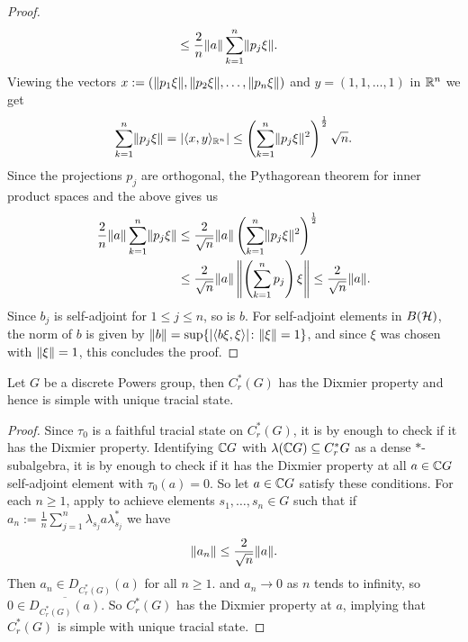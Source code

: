 \begin{proposition}
\begin{proof}
\begin{align*}
&\leq \frac{2}{n} \lVert a \rVert \sum_{k=1}^n \lVert p_j \xi \rVert.
\end{align*}
Viewing the vectors $x:=(\lVert p_1 \xi \rVert, \lVert p_2 \xi \rVert, \dots, \lVert p_n \xi \rVert)$ and $y=(1,1,\dots,1)$ in $\mathbb{R}^n$ we get
\begin{align*}
\sum_{k=1}^n \lVert p_j \xi \rVert= |\langle x , y \rangle_{\mathbb{R}^n}| \leq \left( \sum_{k=1}^n \lVert p_j \xi \rVert^2\right)^{\frac{1}{2}} \sqrt{n}.
\end{align*}
Since the projections $p_j$ are orthogonal, the Pythagorean theorem for inner product spaces and the above gives us
\begin{align*}
\frac{2}{n} \lVert a \rVert \sum_{k=1}^n \lVert p_j \xi \rVert & \leq \frac{2}{\sqrt{n}} \lVert a \rVert \left( \sum_{k=1}^n \lVert p_j \xi \rVert^2\right)^{\frac{1}{2}} \\
&\leq \frac{2}{\sqrt{n}} \lVert a \rVert \left\lVert \left(\sum_{k=1}^n p_j\right) \xi \right\rVert \leq \frac{2}{\sqrt{n}} \lVert a \rVert.
\end{align*}
Since $b_j$ is self-adjoint for $1 \leq j \leq n$, so is $b$. For self-adjoint elements in $B(\mathcal{H})$, the norm of $b$ is given by $\lVert b \rVert= \sup\{|\langle b \xi , \xi \rangle| \colon \lVert \xi \rVert = 1\}$, and since $\xi$ was chosen with $\lVert \xi \rVert = 1$, this concludes the proof.
\end{proof}
\end{proposition}

\begin{theorem}\label{powers group dixmier}
Let $G$ be a discrete Powers group, then $C_r^*(G)$ has the Dixmier property and hence is simple with unique tracial state.
\begin{proof}
Since $\tau_0$ is a faithful tracial state on $C_r^*(G)$, it is by  enough to check if it has the Dixmier property. Identifying $\mathbb{C} G$ with $\lambda(\mathbb{C} G) \subseteq C_r^*G$ as a dense $*$-subalgebra, it is by  enough to check if it has the Dixmier property at all $a \in \mathbb{C} G$ self-adjoint element with $\tau_0(a)=0$. So let $a \in \mathbb{C} G$ satisfy these conditions. For each $n \geq 1$, apply  to achieve elements $s_1, \dots, s_n \in G$ such that if $a_n:= \frac{1}{n} \sum_{j=1}^n \lambda_{s_j} a \lambda_{s_j}^*$ we have
\begin{align*}
\lVert a_n \rVert \leq \frac{2}{\sqrt{n}} \lVert a \rVert.
\end{align*}
Then $a_n \in D_{C_r^*(G)}(a)$ for all $n \geq 1$. and $a_n \to 0$ as $n$ tends to infinity, so $0 \in \overline{D_{C_r^*(G)}(a)}$. So $C_r^*(G)$ has the Dixmier property at $a$, implying that $C_r^*(G)$ is simple with unique tracial state.
\end{proof}
\end{theorem}
 
